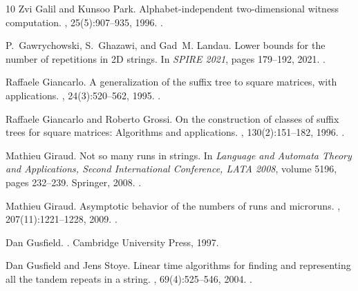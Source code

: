 \documentclass[11pt,letterpaper]{article}
\begin{document}
\begin{thebibliography}{10}
Zvi Galil and Kunsoo Park.
\newblock Alphabet-independent two-dimensional witness computation.
, 25(5):907--935, 1996.
\newblock \href {https://doi.org/10.1137/S0097539792241941}
  {}.

P.~Gawrychowski, S.~Ghazawi, and Gad~M. Landau.
\newblock Lower bounds for the number of repetitions in {2D} strings.
\newblock In {\em {SPIRE} 2021}, pages 179--192, 2021.
\newblock \href {https://doi.org/10.1007/978-3-030-86692-1\_15}
  {}.

Raffaele Giancarlo.
\newblock A generalization of the suffix tree to square matrices, with
  applications.
, 24(3):520--562, 1995.
\newblock \href {https://doi.org/10.1137/S0097539792231982}
  {}.

Raffaele Giancarlo and Roberto Grossi.
\newblock On the construction of classes of suffix trees for square matrices:
  Algorithms and applications.
, 130(2):151--182, 1996.
\newblock \href {https://doi.org/10.1006/INCO.1996.0087}
  {}.

Mathieu Giraud.
\newblock Not so many runs in strings.
\newblock In {\em Language and Automata Theory and Applications, Second
  International Conference, {LATA} 2008}, volume 5196, pages 232--239.
  Springer, 2008.
\newblock \href {https://doi.org/10.1007/978-3-540-88282-4\_22}
  {}.

Mathieu Giraud.
\newblock Asymptotic behavior of the numbers of runs and microruns.
, 207(11):1221--1228, 2009.
\newblock \href {https://doi.org/10.1016/j.ic.2009.02.007}
  {}.

Dan Gusfield.
.
\newblock Cambridge University Press, 1997.

Dan Gusfield and Jens Stoye.
\newblock Linear time algorithms for finding and representing all the tandem
  repeats in a string.
, 69(4):525--546, 2004.
\newblock \href {https://doi.org/10.1016/J.JCSS.2004.03.004}
  {}.


\end{thebibliography}
\end{document}
